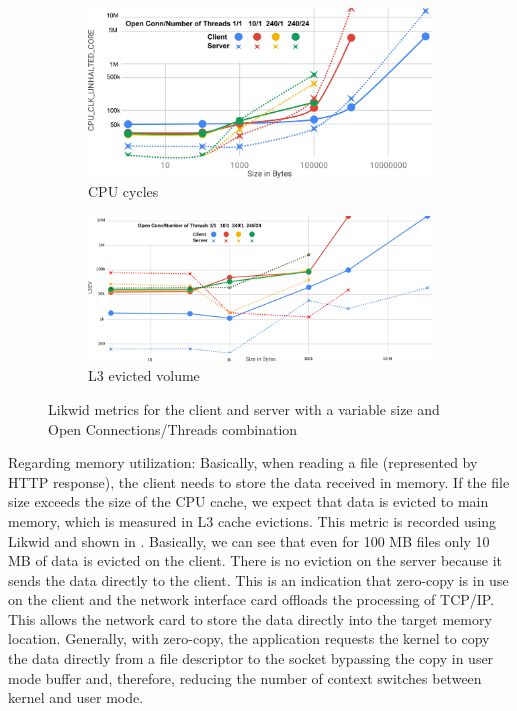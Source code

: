 \documentclass[runningheads]{llncs}
\begin{document}
\begin{figure}[!bt]
    \centering

  \begin{subfigure}[t]{0.8\textwidth}
        \includegraphics[width=1\textwidth]{cuc-to-size.png}\vspace{-0.2em}
        \caption{CPU cycles}\vspace{-0.2em}
		\label{fig:cuc-to-size}
  \end{subfigure}

  \begin{subfigure}[t]{0.8\textwidth}
        \includegraphics[width=1\textwidth]{l3ev-to-size.png}\vspace{-0.2em}
		\caption{L3 evicted volume}\vspace{-0.2em}
		\label{fig:l3ev-to-size}
  \end{subfigure}

\caption{Likwid metrics for the client and server with a variable size and Open Connections/Threads combination}\vspace{-1.2em}
\end{figure}
Regarding memory utilization: Basically, when reading a file (represented by HTTP response), the client needs to store the data received in memory. If the file size exceeds the size of the CPU cache, we expect that data is evicted to main memory, which is measured in L3 cache evictions. This metric is recorded using Likwid and shown in . Basically, we can see that even for 100 MB files only 10 MB of data is evicted on the client. There is no eviction on the server because it sends the data directly to the client. This is an indication that zero-copy \cite{zerocopy} is in use on the client and the network interface card offloads the processing of TCP/IP. This allows  the network card to store the data directly into the target memory location. Generally, with zero-copy, the application requests the kernel to copy the data directly from a file descriptor to the socket bypassing the copy in user mode buffer and, therefore, reducing the number of context switches between kernel and user mode.
\end{document}
